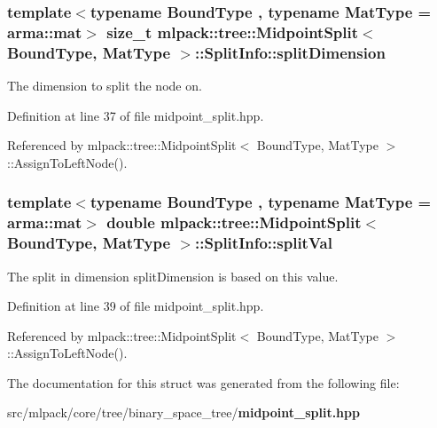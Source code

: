 \subsubsection[{split\+Dimension}]{\setlength{\rightskip}{0pt plus 5cm}template$<$typename Bound\+Type , typename Mat\+Type  = arma\+::mat$>$ size\+\_\+t {\bf mlpack\+::tree\+::\+Midpoint\+Split}$<$ Bound\+Type, Mat\+Type $>$\+::Split\+Info\+::split\+Dimension}\label{structmlpack_1_1tree_1_1MidpointSplit_1_1SplitInfo_af0cef441de07f5400234f638a5640842}


The dimension to split the node on. 



Definition at line 37 of file midpoint\+\_\+split.\+hpp.



Referenced by mlpack\+::tree\+::\+Midpoint\+Split$<$ Bound\+Type, Mat\+Type $>$\+::\+Assign\+To\+Left\+Node().

\subsubsection[{split\+Val}]{\setlength{\rightskip}{0pt plus 5cm}template$<$typename Bound\+Type , typename Mat\+Type  = arma\+::mat$>$ double {\bf mlpack\+::tree\+::\+Midpoint\+Split}$<$ Bound\+Type, Mat\+Type $>$\+::Split\+Info\+::split\+Val}\label{structmlpack_1_1tree_1_1MidpointSplit_1_1SplitInfo_a6ad65dc505cb0b48a3057ffbe911e912}


The split in dimension split\+Dimension is based on this value. 



Definition at line 39 of file midpoint\+\_\+split.\+hpp.



Referenced by mlpack\+::tree\+::\+Midpoint\+Split$<$ Bound\+Type, Mat\+Type $>$\+::\+Assign\+To\+Left\+Node().



The documentation for this struct was generated from the following file\+:\begin{DoxyCompactItemize}
\item 
src/mlpack/core/tree/binary\+\_\+space\+\_\+tree/{\bf midpoint\+\_\+split.\+hpp}\end{DoxyCompactItemize}
